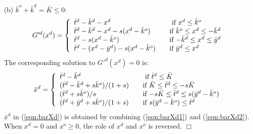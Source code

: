 \documentclass[mnsc,nonblindrev,copyedit]{informs2_wz} %
\newcommand{\qed}{ \hfill $\Box$ }
\begin{document}
\noindent (b) $\bar{k}^o + \bar{k}^d = \bar{K} \leq 0$:
\begin{equation}
G'^d(x^d) = \left\{
  \begin{array} {ll}
  \bar{t}^d -\bar{k}^d -x^d  \quad & \mbox{ if $x^d \leq
  \bar{k}^o
  $} \\
\bar{t}^d-\bar{k}^d -x^d- s(x^d -\bar{k}^o)  \quad  & \mbox{if
$\bar{k}^o \leq x^d \leq -\bar{k}^d$} \\
\bar{t}^d- s(x^d -\bar{k}^o)  \quad  & \mbox{if $ -\bar{k}^d \leq x^d \leq \bar{y}^d$}\\
\bar{t}^d  -(x^d - \bar{y}^d)-s(x^d - \bar{k}^o) \quad  & \mbox{if
$\bar{y}^d \leq x^d$}
  \end{array} \right.
\end{equation}
The corresponding solution to $G'^d(x^d) = 0$ is:
\begin{equation}
\bar{x}^d = \left\{
  \begin{array} {ll}
  \bar{t}^d -\bar{k}^d \quad & \mbox{ if $\bar{t}^d \leq \bar{K}$} \\
(\bar{t}^d  - \bar{k}^d +s\bar{k}^o)/(1+s)  \quad  & \mbox{if $
\bar{K} \leq  \bar{t}^d \leq -s\bar{K}$}\\
(\bar{t}^d  +s\bar{k}^o)/s \quad  & \mbox{if $ -s\bar{K} \leq
\bar{t}^d \leq  s(\bar{y}^d - \bar{k}^o)$} \\
(\bar{t}^d  + \bar{y}^d+s\bar{k}^o)/(1+s) \quad  & \mbox{if $
s(\bar{y}^d - \bar{k}^o) \leq \bar{t}^d $}
  \end{array} \right.  \label{eqn:barXd2}
\end{equation}
$\bar{x}^d$ in (\ref{eqn:barXd}) is obtained by combining (\ref{eqn:barXd1}) and (\ref{eqn:barXd2}).
\\
When $x^d = 0$ and $x^o \geq 0$, the role of $x^d$ and $x^o$ is reversed. \qed
\end{document}
